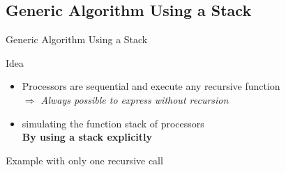 \subsection{Generic Algorithm Using a Stack}
\begin{frame}{Generic Algorithm Using a Stack}
  \begin{block}{Idea}
  \begin{itemize}
  \item Processors are sequential and execute any recursive function \\
   \textit{$\Rightarrow$ Always possible to express without recursion}
  \item {} simulating the function stack of processors\\
    \alert{\textbf{By using a stack explicitly}}
    \pause
  \end{itemize}    
  \end{block}\vspace{-.7\baselineskip}

  \begin{block}{Example with only one recursive call}\vspace{-2\baselineskip}
    \begin{columns}
    \begin{column}[b]{.5\linewidth}    
        \centerline{}
\end{column}
\end{columns}
\end{block}
\end{frame}
